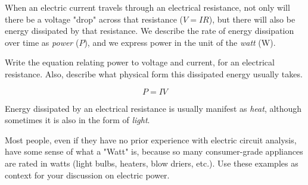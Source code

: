 

When an electric current travels through an electrical resistance, not only will there be a voltage "drop" across that resistance ($V = IR$), but there will also be energy dissipated by that resistance.  We describe the rate of energy dissipation over time as {\it power} ($P$), and we express power in the unit of the {\it watt} (W).

Write the equation relating power to voltage and current, for an electrical resistance.  Also, describe what physical form this dissipated energy usually takes.







$$P = IV$$

Energy dissipated by an electrical resistance is usually manifest as {\it heat}, although sometimes it is also in the form of {\it light}.







Most people, even if they have no prior experience with electric circuit analysis, have some sense of what a "Watt" is, because so many consumer-grade appliances are rated in watts (light bulbs, heaters, blow driers, etc.).  Use these examples as context for your discussion on electric power.




